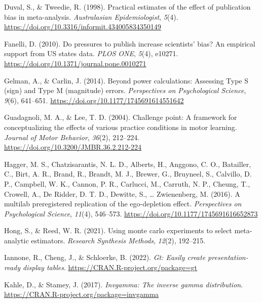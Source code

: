 \documentclass[
  doc, donotrepeattitle,floatsintext]{apa7}
\newlength{\cslhangindent}
\newlength{\cslentryspacingunit} %
\newenvironment{CSLReferences}[2] %
 {%
  \setlength{\parindent}{0pt}
  \ifodd #1
  \let\oldpar\par
  \def\par{\hangindent=\cslhangindent\oldpar}
  \fi
  \setlength{\parskip}{#2\cslentryspacingunit}
 }%
 {}
\begin{document}
\begin{CSLReferences}{1}{0}
\leavevmode{}%
Duval, S., \& Tweedie, R. (1998). Practical estimates of the effect of publication bias in meta-analysis. \emph{Australasian Epidemiologist}, \emph{5}(4). \url{https://doi.org/10.3316/informit.434005834350149}

\leavevmode{}%
Fanelli, D. (2010). Do pressures to publish increase scientists' bias? An empirical support from US states data. \emph{PLOS ONE}, \emph{5}(4), e10271. \url{https://doi.org/10.1371/journal.pone.0010271}

\leavevmode{}%
Gelman, A., \& Carlin, J. (2014). Beyond power calculations: {Assessing Type S} (sign) and {Type M} (magnitude) errors. \emph{Perspectives on Psychological Science}, \emph{9}(6), 641--651. \url{https://doi.org/10.1177/1745691614551642}

\leavevmode{}%
Guadagnoli, M. A., \& Lee, T. D. (2004). Challenge point: A framework for conceptualizing the effects of various practice conditions in motor learning. \emph{Journal of Motor Behavior}, \emph{36}(2), 212--224. \url{https://doi.org/10.3200/JMBR.36.2.212-224}

\leavevmode{}%
Hagger, M. S., Chatzisarantis, N. L. D., Alberts, H., Anggono, C. O., Batailler, C., Birt, A. R., Brand, R., Brandt, M. J., Brewer, G., Bruyneel, S., Calvillo, D. P., Campbell, W. K., Cannon, P. R., Carlucci, M., Carruth, N. P., Cheung, T., Crowell, A., De Ridder, D. T. D., Dewitte, S., \ldots{} Zwienenberg, M. (2016). A multilab preregistered replication of the ego-depletion effect. \emph{Perspectives on Psychological Science}, \emph{11}(4), 546--573. \url{https://doi.org/10.1177/1745691616652873}

\leavevmode{}%
Hong, S., \& Reed, W. R. (2021). Using monte carlo experiments to select meta-analytic estimators. \emph{Research Synthesis Methods}, \emph{12}(2), 192--215.

\leavevmode{}%
Iannone, R., Cheng, J., \& Schloerke, B. (2022). \emph{Gt: Easily create presentation-ready display tables}. \url{https://CRAN.R-project.org/package=gt}

\leavevmode{}%
Kahle, D., \& Stamey, J. (2017). \emph{Invgamma: The inverse gamma distribution}. \url{https://CRAN.R-project.org/package=invgamma}


\end{CSLReferences}
\end{document}
